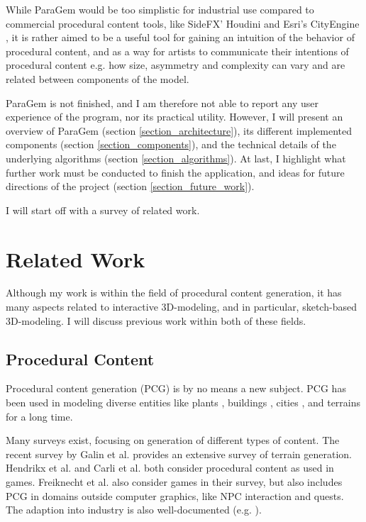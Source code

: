 \documentclass[english]{article}
\begin{document}
While ParaGem would be too simplistic for industrial use compared to commercial procedural content tools, like SideFX' Houdini \cite{houdini} and Esri's CityEngine \cite{cityengine}, it is rather aimed to be a useful tool for gaining an intuition of the behavior of procedural content, and as a way for artists to communicate their intentions of procedural content e.g. how size, asymmetry and complexity can vary and are related between components of the model.

ParaGem is not finished, and I am therefore not able to report any user experience of the program, nor its practical utility. However, I will present an overview of ParaGem (section \ref{section_architecture}), its different implemented components (section \ref{section_components}), and the technical details of the underlying algorithms (section \ref{section_algorithms}). At last, I highlight what further work must be conducted to finish the application, and ideas for future directions of the project (section \ref{section_future_work}).

I will start off with a survey of related work.

\pagebreak

\section{Related Work}

Although my work is within the field of procedural content generation, it has many aspects related to interactive 3D-modeling, and in particular, sketch-based 3D-modeling. I will discuss previous work within both of these fields.

\subsection{Procedural Content}

Procedural content generation (PCG) is by no means a new subject. PCG has been used in modeling diverse entities like plants \cite{plant_l_system}, buildings \cite{building_shape_grammar}, cities \cite{procedural_city_modeling}, and terrains \cite{early_terrain_generation} for a long time. 

Many surveys exist, focusing on generation of different types of content. The recent survey by Galin et al. \cite{terrain_survey_2019} provides an extensive survey of terrain generation. Hendrikx et al. \cite{pcg_survey_2013} and Carli et al. \cite{brazilian_pcg_survey} both consider procedural content as used in games. Freiknecht et al. \cite{pcg_survey_2017} also consider games in their survey, but also includes PCG in domains outside computer graphics, like NPC interaction and quests. The adaption into industry is also well-documented (e.g. \cite{amato2017}).
\end{document}
